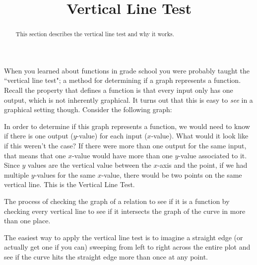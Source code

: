 \documentclass{ximeraXloud}
\title{Vertical Line Test}
\begin{document}
\begin{abstract}
This section describes the vertical line test and why it works.
\end{abstract}
\maketitle
 
When you learned about functions in grade school you were probably taught the ``vertical line test"; a method for determining if a graph represents a function. Recall the property that defines a function is that every input only has one output, which is not inherently graphical. It turns out that this is easy to \textit{see} in a graphical setting though. Consider the following graph:

\begin{center}
\end{center}

In order to determine if this graph represents a function, we would need to know if there is one output ($y$-value) for each input ($x$-value). What would it look like if this weren't the case? If there were more than one output for the same input, that means that one $x$-value would have more than one $y$-value associated to it. Since $y$ values are the vertical value between the $x$-axis and the point, if we had multiple $y$-values for the same $x$-value, there would be two points on the same vertical line. This is the Vertical Line Test.

\begin{definition}
    The process of checking the graph of a relation to see if it is a function by checking every vertical line to see if it intersects the graph of the curve in more than one place. 
\end{definition}

The easiest way to apply the vertical line test is to imagine a straight edge (or actually get one if you can) sweeping from left to right across the entire plot and see if the curve hits the straight edge more than once at any point.
\end{document}

